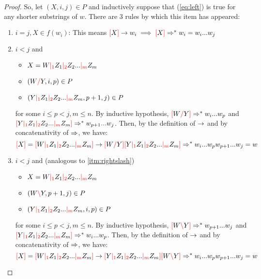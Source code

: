 \documentclass[main.tex]{subfiles}
\begin{document}
\begin{proof}
    So, let $(X, i, j) \in P$ and inductively suppose that (\ref{eq:left}) is true
    for any shorter substrings of $w$. There are 3 rules by which this item has appeared:
    \begin{enumerate}
        \item $i = j, X \in f(w_i)$: This means
            $\textcolor{red}{[} X \textcolor{red}{]} \rightarrow w_i \implies \textcolor{red}{[} X \textcolor{red}{]} \Rightarrow^* w_i = w_i ... w_j$
        \item \label{itm:rightslash} $i < j$ and
            \begin{itemize}
                \item $X = W \textcolor{red}{|_{1}} Z_1 \textcolor{red}{|_{2}} Z_2 ... \textcolor{red}{|_{m}} Z_m$
                \item $(W \textcolor{red}{/} Y, i, p) \in P$
                \item $(Y \textcolor{red}{|_{1}} Z_1 \textcolor{red}{|_{2}} Z_2 ... \textcolor{red}{|_{m}} Z_m, p + 1, j) \in P$
            \end{itemize}
            for some $i \leq p < j, m \leq n$. By inductive hypothesis,
            $\textcolor{red}{[} W \textcolor{red}{/} Y \textcolor{red}{]} \Rightarrow^* w_i ... w_p$
            and
            $\textcolor{red}{[} Y \textcolor{red}{|_{1}} Z_1 \textcolor{red}{|_{2}} Z_2 ... \textcolor{red}{|_{m}} Z_m \textcolor{red}{]} \Rightarrow^* w_{p + 1} ... w_j$.
            Then, by the definition of $\rightarrow$ and by concatenativity of
            $\Rightarrow$, we have:
            \[
                \textcolor{red}{[} X \textcolor{red}{]} = \textcolor{red}{[} W \textcolor{red}{|_{1}} Z_1 \textcolor{red}{|_{2}} Z_2 ... \textcolor{red}{|_{m}} Z_m \textcolor{red}{]}
                \rightarrow
                \textcolor{red}{[} W \textcolor{red}{/} Y \textcolor{red}{]} \textcolor{red}{[} Y \textcolor{red}{|_{1}} Z_1 \textcolor{red}{|_{2}} Z_2 ... \textcolor{red}{|_{m}} Z_m \textcolor{red}{]}
                \Rightarrow^*
                w_i ... w_p w_{p + 1} ... w_j = w
            \]
        \item $i < j$ and (analogous to \ref{itm:rightslash})
            \begin{itemize}
                \item $X = W \textcolor{red}{|_{1}} Z_1 \textcolor{red}{|_{2}} Z_2 ... \textcolor{red}{|_{m}} Z_m$
                \item $(W \textcolor{red}{\backslash} Y, p + 1, j) \in P$
                \item $(Y \textcolor{red}{|_{1}} Z_1 \textcolor{red}{|_{2}} Z_2 ... \textcolor{red}{|_{m}} Z_m, i, p) \in P$
            \end{itemize}
            for some $i \leq p < j, m \leq n$. By inductive hypothesis,
            $\textcolor{red}{[} W \textcolor{red}{\backslash} Y \textcolor{red}{]} \Rightarrow^* w_{p + 1} ... w_j$
            and
            $\textcolor{red}{[} Y \textcolor{red}{|_{1}} Z_1 \textcolor{red}{|_{2}} Z_2 ... \textcolor{red}{|_{m}} Z_m \textcolor{red}{]} \Rightarrow^* w_i ... w_p$.
            Then, by the definition of $\rightarrow$ and by concatenativity of
            $\Rightarrow$, we have:
            \[
                \textcolor{red}{[} X \textcolor{red}{]} = \textcolor{red}{[} W \textcolor{red}{|_{1}} Z_1 \textcolor{red}{|_{2}} Z_2 ... \textcolor{red}{|_{m}} Z_m \textcolor{red}{]}
                \rightarrow
                \textcolor{red}{[} Y \textcolor{red}{|_{1}} Z_1 \textcolor{red}{|_{2}} Z_2 ... \textcolor{red}{|_{m}} Z_m \textcolor{red}{]} \textcolor{red}{[} W \textcolor{red}{\backslash} Y \textcolor{red}{]}
                \Rightarrow^*
                w_i ... w_p w_{p + 1} ... w_j = w
            \]
    \end{enumerate}
\end{proof}
\end{document}
